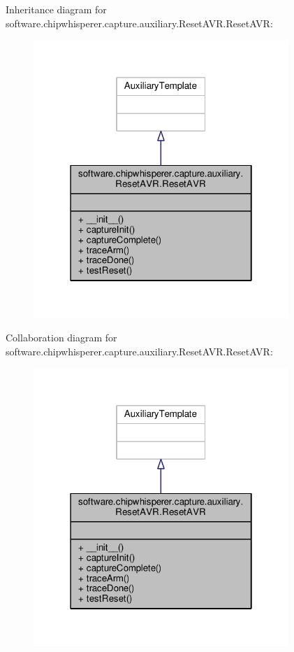 Inheritance diagram for software.\+chipwhisperer.\+capture.\+auxiliary.\+Reset\+A\+V\+R.\+Reset\+A\+V\+R\+:\nopagebreak
\begin{figure}[H]
\begin{center}
\leavevmode
\includegraphics[width=274pt]{d1/d4b/classsoftware_1_1chipwhisperer_1_1capture_1_1auxiliary_1_1ResetAVR_1_1ResetAVR__inherit__graph}
\end{center}
\end{figure}


Collaboration diagram for software.\+chipwhisperer.\+capture.\+auxiliary.\+Reset\+A\+V\+R.\+Reset\+A\+V\+R\+:\nopagebreak
\begin{figure}[H]
\begin{center}
\leavevmode
\includegraphics[width=274pt]{d9/d17/classsoftware_1_1chipwhisperer_1_1capture_1_1auxiliary_1_1ResetAVR_1_1ResetAVR__coll__graph}
\end{center}
\end{figure}


